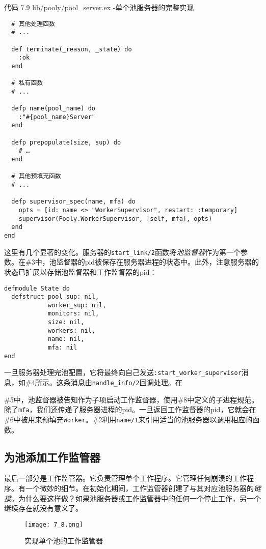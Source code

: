 \begin{code}{代码 7.9 lib/pooly/pool\_server.ex -单个池服务器的完整实现}
\begin{verbatim}
  # 其他处理函数
  # ...

  def terminate(_reason, _state) do
    :ok
  end

  # 私有函数
  # ...

  defp name(pool_name) do
    :"#{pool_name}Server"
  end

  defp prepopulate(size, sup) do
    # …
  end

  # 其他预填充函数
  # ...

  defp supervisor_spec(name, mfa) do
    opts = [id: name <> "WorkerSupervisor", restart: :temporary]
    supervisor(Pooly.WorkerSupervisor, [self, mfa], opts)
  end
end
\end{verbatim}
\end{code}

这里有几个显著的变化。服务器的\texttt{start\_link/2}函数将\emph{池监督器}作为第一个参数。在\#3中，池监督器的pid被保存在服务器进程的状态中。此外，注意服务器的状态已扩展以存储池监督器和工作监督器的pid：

\begin{code}{}
\begin{verbatim}
defmodule State do
  defstruct pool_sup: nil,
            worker_sup: nil,
            monitors: nil,
            size: nil,
            workers: nil,
            name: nil,
            mfa: nil
end
\end{verbatim}
\end{code}

一旦服务器处理完池配置，它将最终向自己发送\texttt{:start\_worker\_supervisor}消息，如\#4所示。这条消息由\texttt{handle\_info/2}回调处理。在

\#5中，池监督器被告知作为子项启动工作监督器，使用\#8中定义的子进程规范。除了\texttt{mfa}，我们还传递了服务器进程的pid。一旦返回工作监督器的pid，它就会在\#6中被用来预填充\texttt{Worker}。\#2利用\texttt{name/1}来引用适当的池服务器以调用相应的函数。

\subsection{为池添加工作监管器}

最后一部分是工作监管器。它负责管理单个工作程序。它管理任何崩溃的工作程序。有一个微妙的细节。在初始化期间，工作监管器创建了与其对应池服务器的\emph{链接}。为什么要这样做？如果池服务器或工作监管器中的任何一个停止工作，另一个继续存在就没有意义了。

\begin{figure}[!ht]
    \centering
    \texttt{[image: 7\_8.png]}
    \caption{实现单个池的工作监管器}
    \label{fig:7_8}
\end{figure}


